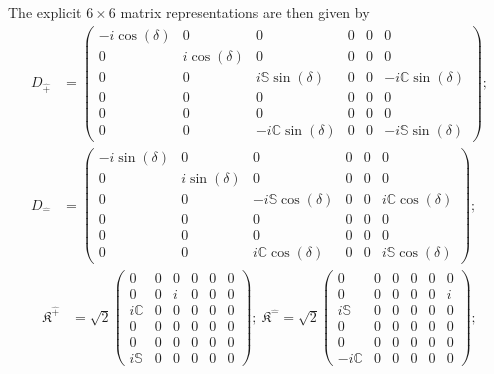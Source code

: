 \documentclass[journal,article,submit,pdftex,moreauthors]{Definitions/mdpi}
\begin{document}
The explicit $6\times6$ matrix representations are then given by %
\begin{align}
    D_{\hat{+}}&=\begin{pmatrix}
        -i\cos{(\delta)}&0&0&0&0&0\\
        0&i\cos{(\delta)}&0&0&0&0\\
        0&0&i\mathbb{S}\sin{(\delta)}&0&0&-i\mathbb{C}\sin{(\delta)}\\
        0&0&0&0&0&0\\
        0&0&0&0&0&0\\
        0&0&-i\mathbb{C}\sin{(\delta)}&0&0&-i\mathbb{S}\sin{(\delta)}
    \end{pmatrix};\nonumber\\
    D_{\hat{-}}&=\begin{pmatrix}
        -i\sin{(\delta)}&0&0&0&0&0\\
        0&i\sin{(\delta)}&0&0&0&0\\
        0&0&-i\mathbb{S}\cos{(\delta)}&0&0&i\mathbb{C}\cos{(\delta)}\\
        0&0&0&0&0&0\\
        0&0&0&0&0&0\\
        0&0&i\mathbb{C}\cos{(\delta)}&0&0&i\mathbb{S}\cos{(\delta)}
    \end{pmatrix};\nonumber
\end{align}
\begin{align}
    \mathfrak{K}^{\hat{+}}&=\sqrt{2}\begin{pmatrix}
        0&0&0&0&0&0\\
        0&0&i&0&0&0\\
        i\mathbb{C}&0&0&0&0&0\\
        0&0&0&0&0&0\\
        0&0&0&0&0&0\\
        i\mathbb{S}&0&0&0&0&0
    \end{pmatrix};
    ~\mathfrak{K}^{\hat{-}}=\sqrt{2}\begin{pmatrix}
        0&0&0&0&0&0\\
        0&0&0&0&0&i\\
        i\mathbb{S}&0&0&0&0&0\\
        0&0&0&0&0&0\\
        0&0&0&0&0&0\\
        -i\mathbb{C}&0&0&0&0&0
    \end{pmatrix};\nonumber
    \end{align}
\end{document}
